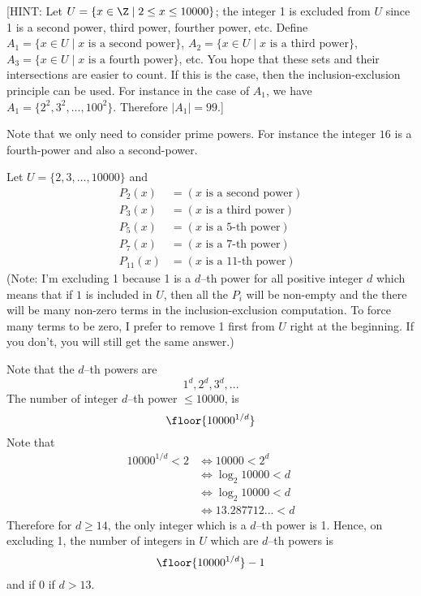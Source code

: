 
[HINT: 
Let 
$U = \{x \in \Z \mid 2 \leq x \leq 10000\}$;
the integer 1 is excluded from $U$ since 1 is a second power,
third power, fourther power, etc. 
Define $A_1 = \{x \in U \mid x \text{ is a second power}\}$,
$A_2 = \{x \in U \mid x \text{ is a third power}\}$, 
$A_3 = \{x \in U \mid x \text{ is a fourth power}\}$, 
etc.
You hope that these sets and their intersections are easier to count.
If this is the case, then the inclusion-exclusion principle can be used.
For instance in the case of $A_1$,
we have $A_1 = \{2^2, 3^2, ..., 100^2\}$.
Therefore $|A_1| = 99$.]

Note that we only need to consider prime powers.
For instance the integer $16$ is a fourth-power and also a second-power.

Let $U = \{2, 3, \ldots, 10000\}$ and 
\begin{align*}
P_2(x)    &= (x \text{ is a second power}) \\
P_3(x)    &= (x \text{ is a third power}) \\
P_5(x)    &= (x \text{ is a 5-th power}) \\
P_7(x)    &= (x \text{ is a 7-th power}) \\
P_{11}(x) &= (x \text{ is a 11-th power})
\end{align*}
(Note: I'm excluding 1 because 1 is a $d$--th power for all 
positive integer $d$ which  means that if $1$ is included in $U$,
then all the $P_i$ will be non-empty and the there will be many 
non-zero
terms in the inclusion-exclusion computation.
To force many terms to be zero, I prefer to remove 1 first
from $U$ right at the beginning. 
If you don't, you will still get the same answer.)

Note that the $d$--th powers are
\[
1^d, 2^d, 3^d, ...
\]
The number of integer $d$--th power $\leq 10000$, is
\[
\floor{10000^{1/d}}
\]
Note that 
\begin{align*}
      10000^{1/d} < 2 
&\iff   10000 < 2^d \\
&\iff   \log_2 10000 < d \\
&\iff   \log_2 10000 < d \\
&\iff   13.287712... < d
\end{align*}
Therefore for $d \geq 14$, the only integer which is a $d$--th power
is 1.
Hence, on excluding 1, the number of integers in $U$ which are
$d$--th powers is
\[
\floor{10000^{1/d}} - 1
\]
and if 0 if $d > 13$.

